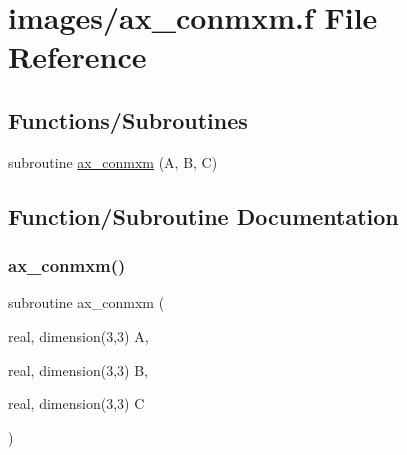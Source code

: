\hypertarget{ax__conmxm_8f}{}\section{images/ax\+\_\+conmxm.f File Reference}
\label{ax__conmxm_8f}
\subsection*{Functions/\+Subroutines}
\begin{DoxyCompactItemize}
\item 
subroutine \hyperlink{ax__conmxm_8f_a12332de744fd78275c91c8e694867149}{ax\+\_\+conmxm} (A, B, C)
\end{DoxyCompactItemize}


\subsection{Function/\+Subroutine Documentation}
\mbox{\label{ax__conmxm_8f_a12332de744fd78275c91c8e694867149}} 
\subsubsection{\texorpdfstring{ax\+\_\+conmxm()}{ax\_conmxm()}}
{\footnotesize\ttfamily subroutine ax\+\_\+conmxm (\begin{DoxyParamCaption}\item[{real, dimension(3,3)}]{A,  }\item[{real, dimension(3,3)}]{B,  }\item[{real, dimension(3,3)}]{C }\end{DoxyParamCaption})}


